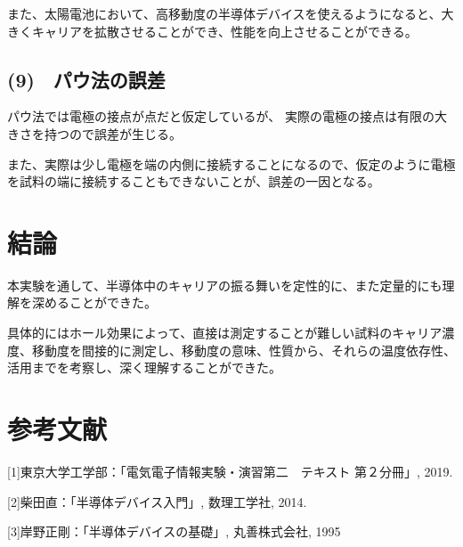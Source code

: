 \documentclass[dvipdfmx]{jsarticle}
\begin{document}
また、太陽電池において、高移動度の半導体デバイスを使えるようになると、大きくキャリアを拡散させることができ、性能を向上させることができる。

\subsection*{(9)　パウ法の誤差}
パウ法では電極の接点が点だと仮定しているが、
実際の電極の接点は有限の大きさを持つので誤差が生じる。

また、実際は少し電極を端の内側に接続することになるので、仮定のように電極を試料の端に接続することもできないことが、誤差の一因となる。

\section{結論}

本実験を通して、半導体中のキャリアの振る舞いを定性的に、また定量的にも理解を深めることができた。

具体的にはホール効果によって、直接は測定することが難しい試料のキャリア濃度、移動度を間接的に測定し、移動度の意味、性質から、それらの温度依存性、活用までを考察し、深く理解することができた。

\section{参考文献}
[1]東京大学工学部：「電気電子情報実験・演習第二　テキスト 第２分冊」, 2019.

[2]柴田直：「半導体デバイス入門」, 数理工学社, 2014.

[3]岸野正剛：「半導体デバイスの基礎」, 丸善株式会社, 1995
\end{document}
